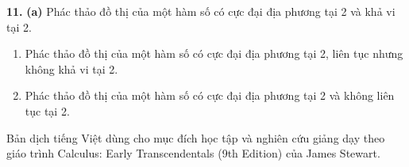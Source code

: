 \begin{minipage}[t]{0.48\textwidth}
    \vspace{1.0em}
    \noindent\textbf{11.} \textbf{(a)} Phác thảo đồ thị của một hàm số có cực đại địa phương tại 2 và khả vi tại 2.
    \begin{enumerate}[label=\textbf{(\alph*)}, leftmargin=1.8em, itemsep=3pt, topsep=2pt, start=2]
        \item Phác thảo đồ thị của một hàm số có cực đại địa phương tại 2, liên tục nhưng không khả vi tại 2.
        \item Phác thảo đồ thị của một hàm số có cực đại địa phương tại 2 và không liên tục tại 2.
    \end{enumerate}
\end{minipage}

\vfill
\noindent{\color{stewartcyan}\rule{\textwidth}{0.6pt}}
\vspace{2pt}
\begin{center}
    \fontsize{7pt}{8pt}\selectfont\color{stewartgray}
    Bản dịch tiếng Việt dùng cho mục đích học tập và nghiên cứu giảng dạy theo giáo trình Calculus: Early Transcendentals (9th Edition) của James Stewart.
\end{center}
